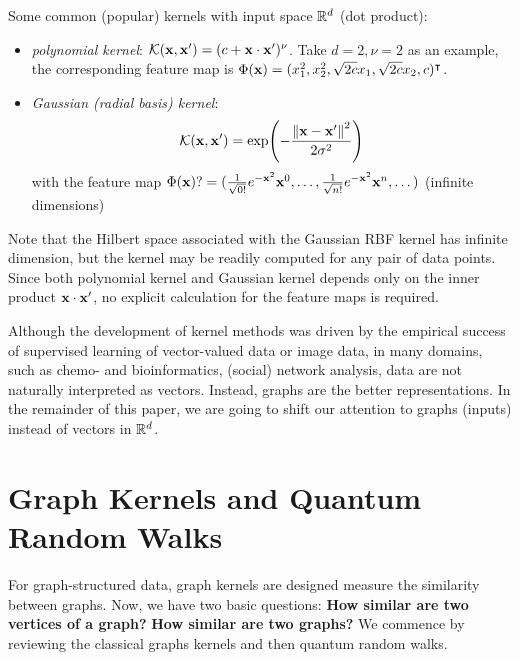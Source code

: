 \begin{example}
Some common (popular) kernels with input space $\mathbb{R}^d$ (dot product):
\begin{itemize}
	\item \emph{polynomial kernel}:
	$\mathcal{K}(\vb{x},\vb{x}')=(c+\vb{x}\cdot \vb{x}')^\nu$.
	Take $d=2,\nu=2$ as an example, the corresponding feature map is $\Phi(\vb{x})=(x_1^2,x_2^2,\sqrt{2c}x_1,\sqrt{2c}x_2,c)^\intercal$.

	\item \emph{Gaussian (radial basis) kernel}:
	\begin{equation}
		\mathcal{K}(\vb{x},\vb{x}') = 
		\exp(-\frac{\norm{\vb{x}-\vb{x}'}^2}{2\sigma^2})
		\label{eq:gaussian_kernel}
	\end{equation}
	with the feature map $\Phi(\vb{x})?=(\frac{1}{\sqrt{0!}}e^{-\vb{x}^2}\vb{x}^0,\dots,\frac{1}{\sqrt{n!}}e^{-\vb{x}^2}\vb{x}^n,\dots)$ (infinite dimensions)
\end{itemize}
\end{example}
\begin{remark}
Note that the Hilbert space associated with the Gaussian RBF kernel has infinite dimension, but the kernel may be readily computed for any pair of data points.
Since both polynomial kernel and Gaussian kernel depends only on the inner product $\vb{x}\cdot\vb{x}'$, 
no explicit calculation for the feature maps is required. 
\end{remark}
Although the development of kernel methods was driven by the empirical success of supervised learning of vector-valued data or image data, 
in many domains, such as chemo- and bioinformatics, (social) network analysis, data are not naturally interpreted as vectors.
Instead, graphs are the better representations.
In the remainder of this paper, we are going to shift our attention to graphs (inputs) instead of vectors in $ \mathbb{R}^d$.

\section{Graph Kernels and Quantum Random Walks}
For graph-structured data, graph kernels are designed measure the similarity between graphs.
Now, we have two basic questions:
\textbf{How similar are two vertices of a graph?}
\textbf{How similar are two graphs?}
We commence by reviewing the classical graphs kernels and then quantum random walks.

